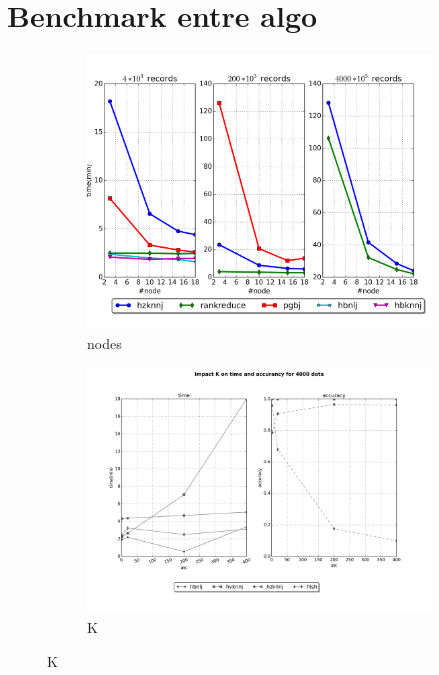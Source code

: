 \documentclass[10pt,a4paper]{article}
\begin{document}
\section{Benchmark entre algo}

 \begin{figure}[ht]
 \centering
 	  \begin{subfigure}[b]{0.3\textwidth}
                 \includegraphics[width=\textwidth]{../graph/geo/nodes.png} 
                \caption{nodes}
        \end{subfigure}%
        \begin{subfigure}[b]{0.3\textwidth}
                 \includegraphics[width=\textwidth]{../graph/geo/K.png} 
                \caption{K}

\end{subfigure}
\end{figure}
\end{document}
